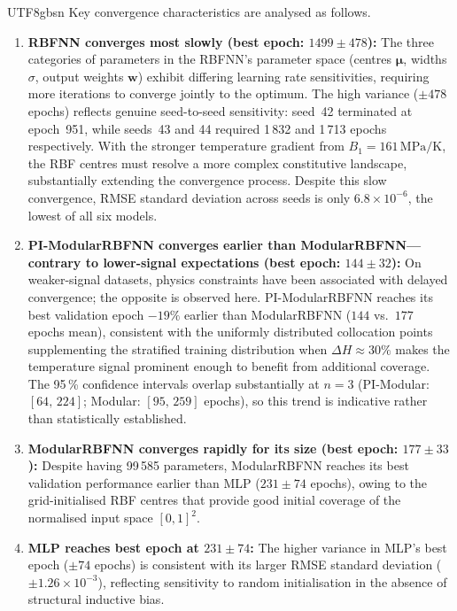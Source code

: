 \documentclass[a4paper,12pt]{report}
\begin{document}
\begin{CJK}{UTF8}{gbsn}
Key convergence characteristics are analysed as follows.

\begin{enumerate}
  \item \textbf{RBFNN converges most slowly (best epoch: $1499 \pm 478$):} The three
    categories of parameters in the RBFNN's parameter space (centres $\boldsymbol{\mu}$,
    widths $\sigma$, output weights $\mathbf{w}$) exhibit differing learning rate
    sensitivities, requiring more iterations to converge jointly to the optimum.
    The high variance ($\pm 478$ epochs) reflects genuine seed-to-seed sensitivity:
    seed~42 terminated at epoch~951, while seeds~43 and 44 required 1\,832 and
    1\,713 epochs respectively. With the stronger temperature gradient from
    $B_1 = 161\,\mathrm{MPa/K}$, the RBF centres must resolve a more complex
    constitutive landscape, substantially extending the convergence process.
    Despite this slow convergence, RMSE standard deviation across seeds is only
    $6.8 \times 10^{-6}$, the lowest of all six models.
  \item \textbf{PI-ModularRBFNN converges earlier than ModularRBFNN---contrary to
    lower-signal expectations (best epoch: $144 \pm 32$):}
    On weaker-signal datasets, physics constraints have been associated with delayed
    convergence; the opposite is observed here. PI-ModularRBFNN reaches its best
    validation epoch $-19\%$ earlier than ModularRBFNN ($144$ vs.\ $177$ epochs mean),
    consistent with the uniformly distributed collocation points supplementing the
    stratified training distribution when $\Delta H \approx 30\%$ makes the temperature
    signal prominent enough to benefit from additional coverage. The 95\,\% confidence
    intervals overlap substantially at $n{=}3$ (PI-Modular: $[64,\,224]$; Modular:
    $[95,\,259]$ epochs), so this trend is indicative rather than statistically
    established.
  \item \textbf{ModularRBFNN converges rapidly for its size (best epoch: $177 \pm 33$):}
    Despite having 99\,585 parameters, ModularRBFNN reaches its best validation
    performance earlier than MLP ($231 \pm 74$ epochs), owing to the grid-initialised RBF
    centres that provide good initial coverage of the normalised input space $[0,1]^2$.
  \item \textbf{MLP reaches best epoch at $231 \pm 74$:}
    The higher variance in MLP's best epoch ($\pm 74$ epochs) is consistent with its
    larger RMSE standard deviation ($\pm 1.26 \times 10^{-3}$), reflecting sensitivity
    to random initialisation in the absence of structural inductive bias.

\end{enumerate}
\end{CJK}
\end{document}
